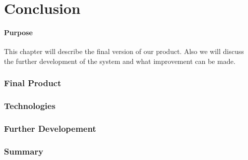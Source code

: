 \chapter{Conclusion}

\minitoc

\subsubsection{Purpose}
This chapter will describe the final version of our product. Also we will discuss the further development of the system and what improvement can be made.

\clearpage

\subsection{Final Product}


\subsection{Technologies}


\subsection{Further Developement}


\subsection{Summary}


